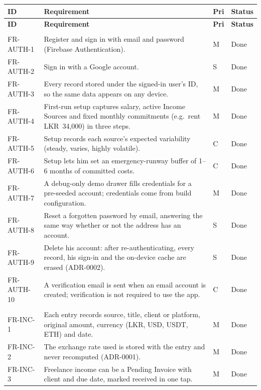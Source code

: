 \documentclass[11pt,a4paper]{article}
\newcommand{\lkr}[1]{LKR~#1}
\begin{document}
\begin{longtable}{|>{\raggedright\arraybackslash}p{2.2cm}|>{\raggedright\arraybackslash}p{9.5cm}|C{0.7cm}|>{\raggedright\arraybackslash}p{1.6cm}|}
\hline
\textbf{ID} & \textbf{Requirement} & \textbf{Pri} & \textbf{Status}\\
\hline
\endfirsthead
\hline
\textbf{ID} & \textbf{Requirement} & \textbf{Pri} & \textbf{Status}\\
\hline
\endhead
{}\\
FR-AUTH-1 & Register and sign in with email and password (Firebase Authentication). & M & Done\\
FR-AUTH-2 & Sign in with a Google account. & S & Done\\
FR-AUTH-3 & Every record stored under the signed-in user's ID, so the same data appears on any device. & M & Done\\
FR-AUTH-4 & First-run setup captures salary, active Income Sources and fixed monthly commitments (e.g.\ rent \lkr{34,000}) in three steps. & M & Done\\
FR-AUTH-5 & Setup records each source's expected variability (steady, varies, highly volatile). & C & Done\\
FR-AUTH-6 & Setup lets him set an emergency-runway buffer of 1--6 months of committed costs. & C & Done\\
FR-AUTH-7 & A debug-only demo drawer fills credentials for a pre-seeded account; credentials come from build configuration. & M & Done\\
FR-AUTH-8 & Reset a forgotten password by email, answering the same way whether or not the address has an account. & S & Done\\
FR-AUTH-9 & Delete his account: after re-authenticating, every record, his sign-in and the on-device cache are erased (ADR-0002). & S & Done\\
FR-AUTH-10 & A verification email is sent when an email account is created; verification is not required to use the app. & C & Done\\
\\
FR-INC-1 & Each entry records source, title, client or platform, original amount, currency (LKR, USD, USDT, ETH) and date. & M & Done\\
FR-INC-2 & The exchange rate used is stored with the entry and never recomputed (ADR-0001). & M & Done\\
FR-INC-3 & Freelance income can be a Pending Invoice with client and due date, marked received in one tap. & M & Done\\

\end{longtable}
\end{document}
